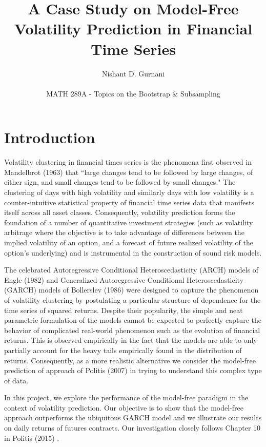 \documentclass[11pt,]{article}
\title{A Case Study on Model-Free Volatility Prediction in Financial Time Series}
\author{Nishant D. Gurnani \\ \\ MATH 289A - Topics on the Bootstrap \& Subsampling}
\begin{document}
\maketitle


\section{Introduction} \label{sec:intro}

Volatility clustering in financial times series is the phenomena first observed in Mandelbrot (1963) \cite{Mandelbrot1963} that ``large changes tend to be followed by large changes, of either sign, and small changes tend to be followed by small changes." The clustering of days with high volatility and similarly days with low volatility is a counter-intuitive statistical property of financial time series data that manifests itself  across all asset classes. Consequently, volatility prediction forms the foundation of a number of quantitative investment strategies (such as volatility arbitrage where the objective is to take advantage of differences between the implied volatility of an option, and a forecast of future realized volatility of the option's underlying) and is instrumental in the construction of sound risk models. %

The celebrated Autoregressive Conditional Heteroscedasticity (ARCH) models of Engle (1982) \cite{Engle1982} and Generalized Autoregressive Conditional Heteroscedasticity (GARCH) models of Bollerslev (1986) \cite{Bollerslev1986} were designed to capture the phenomenon of volatility clustering by postulating a particular structure of dependence for the time series of squared returns. Despite their popularity, the simple and neat parametric formulation of the models cannot be expected to perfectly capture the behavior of complicated real-world phenomenon such as the evolution of financial returns. This is observed empirically in the fact that the models are able to only partially account for the heavy tails empirically found in the distribution of returns. Consequently, as a more realistic alternative we consider the model-free prediction of approach of Politis (2007) \cite{Politis2007} in trying to understand this complex type of data.

In this project, we explore the performance of the model-free paradigm in the context of volatility prediction. Our objective is to show that the model-free approach outperforms the ubiquitous GARCH model and we illustrate our results on daily returns of futures contracts. Our investigation closely follows Chapter 10 in Politis (2015) \cite{Politis2015}.
\end{document}
